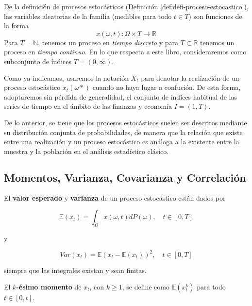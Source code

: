 \documentclass[12pt,]{krantz}
\theoremstyle{definition}
\theoremstyle{definition}
\theoremstyle{definition}
\theoremstyle{remark}
\let\BeginKnitrBlock\begin \let\EndKnitrBlock\end
\begin{document}
De la definición de procesos estocásticos (Definición
\ref{def:defi-proceso-estocastico}), las variables aleatorias de la
familia (medibles para todo \(t\in T\)) son funciones de la forma
\[x(\omega,t):\Omega\times T\to\mathbb{R}\] Para \(T=\mathbb{N}\),
tenemos un proceso en \emph{tiempo discreto} y para
\(T\subset\mathbb{R}\) tenemos un proceso en \emph{tiempo continuo}. En
lo que respecta a este libro, consideraremos como subconjunto de índices
\(T=(0,\infty)\).

Como ya indicamos, usaremos la notación \(X_t\) para denotar la
realización de un proceso estocástico \(x_t(\omega*)\) cuando no haya
lugar a confución. De esta forma, adoptaremos sin pérdida de
generalidad, el conjunto de índices habitual de las series de tiempo en
el ámbito de las finanzas y economía \(I=(1,T)\).

De lo anterior, se tiene que los procesos estocásticos suelen ser
descritos mediante su distribución conjunta de probabilidades, de manera
que la relación que existe entre una realización y un proceso
estocástico es análoga a la existente entre la muestra y la población en
el análisis estadístico clásico.

\subsection{Momentos, Varianza, Covarianza y
Correlación}\label{momentos-varianza-covarianza-y-correlacion}

\BeginKnitrBlock{definition}
\protect\hypertarget{def:defi-esperanza-varianza-procesos}{}{\label{def:defi-esperanza-varianza-procesos}
}El \textbf{valor esperado} y \textbf{varianza} de un proceso
estocástico están dados por

\begin{equation}
\mathbb{E}(x_t)=\int_{\Omega}x(\omega,t)dP(\omega),\quad t\in[0,T]
\label{eq:eq-esperanza-proceso}
\end{equation}

y

\begin{equation}
Var(x_t)=\mathbb{E}(x_t-\mathbb{E}(x_t))^2,\quad t\in[0,T]
\label{eq:eq-varianza-proceso}
\end{equation}

siempre que las integrales existan y sean finitas.
\EndKnitrBlock{definition}

\BeginKnitrBlock{definition}
\protect\hypertarget{def:defi-k-esimo-momento-proceso}{}{\label{def:defi-k-esimo-momento-proceso}
}El \textbf{\(k\)-ésimo momento} de \(x_t\), con \(k\geq1\), se define
como \(\mathbb{E}(x_t^k)\) para todo \(t\in[0,t]\).
\EndKnitrBlock{definition}
\end{document}
